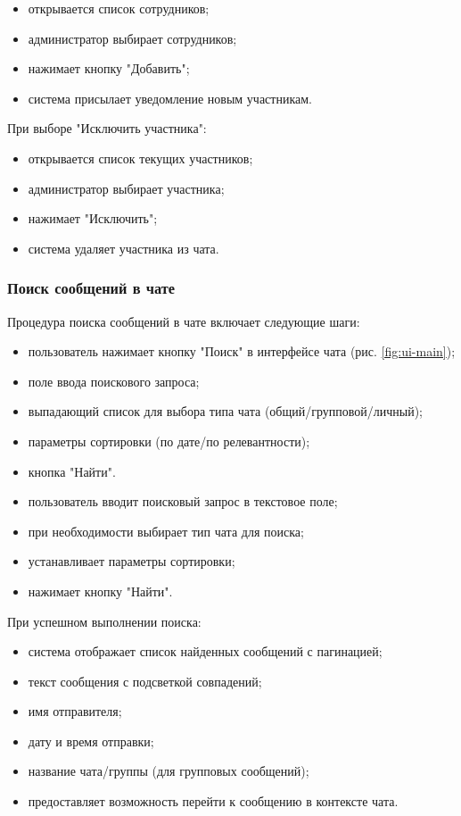 \begin{itemize}
	\item открывается список сотрудников;  
	\item администратор выбирает сотрудников;  
	\item нажимает кнопку "Добавить";  
	\item система присылает уведомление новым участникам.
\end{itemize}

При выборе "Исключить участника":  

\begin{itemize}
	\item открывается список текущих участников;  
	\item администратор выбирает участника;  
	\item нажимает "Исключить";  
	\item система удаляет участника из чата.  
\end{itemize}

\subsubsection{Поиск сообщений в чате}
Процедура поиска сообщений в чате включает следующие шаги:

\begin{itemize}
	\item пользователь нажимает кнопку "Поиск" в интерфейсе чата (рис. \ref{fig:ui-main});
	\item поле ввода поискового запроса;
	\item выпадающий список для выбора типа чата (общий/групповой/личный);
	\item параметры сортировки (по дате/по релевантности);
	\item кнопка "Найти".
	\item пользователь вводит поисковый запрос в текстовое поле;
	\item при необходимости выбирает тип чата для поиска;
	\item устанавливает параметры сортировки;
	\item нажимает кнопку "Найти".
\end{itemize}

При успешном выполнении поиска:
\begin{itemize}
	\item система отображает список найденных сообщений с пагинацией;
		\item текст сообщения с подсветкой совпадений;
		\item имя отправителя;
		\item дату и время отправки;
		\item название чата/группы (для групповых сообщений);
	\item предоставляет возможность перейти к сообщению в контексте чата.
\end{itemize}

